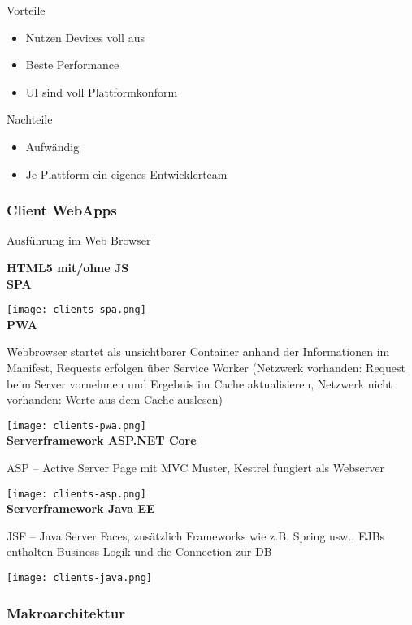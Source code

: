 Vorteile
\begin{itemize}
    \item Nutzen Devices voll aus
    \item Beste Performance
    \item UI sind voll Plattformkonform
\end{itemize}
\vspace{10pt}

Nachteile
\begin{itemize}
    \item Aufwändig
    \item Je Plattform ein eigenes Entwicklerteam
\end{itemize}

\subsubsection{Client WebApps}

Ausführung im Web Browser

\textbf{HTML5 mit/ohne JS} \\

\textbf{SPA}

\texttt{[image: clients-spa.png]} \\

\textbf{PWA}

Webbrowser startet als unsichtbarer Container anhand der Informationen im Manifest, Requests erfolgen über Service Worker (Netzwerk vorhanden: Request beim Server vornehmen und Ergebnis im Cache aktualisieren, Netzwerk nicht vorhanden: Werte aus dem Cache auslesen)

\texttt{[image: clients-pwa.png]} \\

\textbf{Serverframework ASP.NET Core}

ASP – Active Server Page mit MVC Muster, Kestrel fungiert als Webserver

\texttt{[image: clients-asp.png]} \\

\textbf{Serverframework Java EE}

JSF – Java Server Faces, zusätzlich Frameworks wie z.B. Spring usw., EJBs enthalten Business-Logik und die Connection zur DB

\texttt{[image: clients-java.png]}

\subsubsection{Makroarchitektur}

